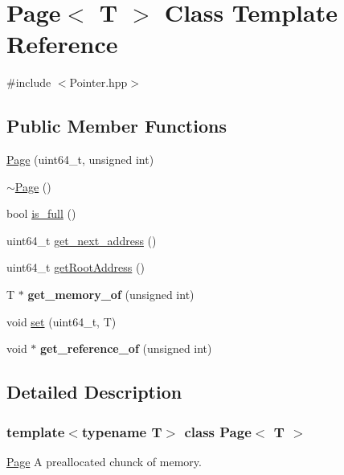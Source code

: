 \hypertarget{class_page}{}\section{Page$<$ T $>$ Class Template Reference}
\label{class_page}


{\ttfamily \#include $<$Pointer.\+hpp$>$}

\subsection*{Public Member Functions}
\begin{DoxyCompactItemize}
\item 
\hyperlink{class_page_ac9e22e2694dfa6a7dc4f80166c0217c5}{Page} (uint64\+\_\+t, unsigned int)
\item 
\hyperlink{class_page_a7312a131c7f52718cf4f2b6f487d31bf}{$\sim$\+Page} ()
\item 
bool \hyperlink{class_page_a8c27abd6fb2ce55c05b065584b4bcc75}{is\+\_\+full} ()
\item 
uint64\+\_\+t \hyperlink{class_page_ae6ac153d53ddb0493a4fff270dfa42cb}{get\+\_\+next\+\_\+address} ()
\item 
uint64\+\_\+t \hyperlink{class_page_a438a928e0ce67dc404f183678eb533ec}{get\+Root\+Address} ()
\item 
\mbox{\label{class_page_a2695af38818eda73c4e8b5e00d04fa55}} 
T $\ast$ {\bfseries get\+\_\+memory\+\_\+of} (unsigned int)
\item 
void \hyperlink{class_page_a4de67b2afdfe14758388f745a8a99d56}{set} (uint64\+\_\+t, T)
\item 
\mbox{\label{class_page_aefe72b00d99730ca199f7d42c1b7d95f}} 
void $\ast$ {\bfseries get\+\_\+reference\+\_\+of} (unsigned int)
\end{DoxyCompactItemize}


\subsection{Detailed Description}
\subsubsection*{template$<$typename T$>$\newline
class Page$<$ T $>$}

\hyperlink{class_page}{Page} A preallocated chunck of memory.

